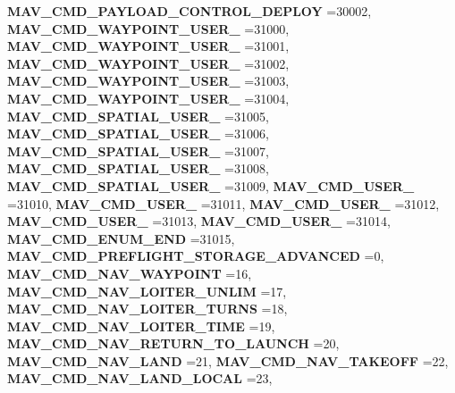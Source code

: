\begin{DoxyCompactItemize}
\textbf{ M\+A\+V\+\_\+\+C\+M\+D\+\_\+\+P\+A\+Y\+L\+O\+A\+D\+\_\+\+C\+O\+N\+T\+R\+O\+L\+\_\+\+D\+E\+P\+L\+OY} =30002, 
\textbf{ M\+A\+V\+\_\+\+C\+M\+D\+\_\+\+W\+A\+Y\+P\+O\+I\+N\+T\+\_\+\+U\+S\+E\+R\+\_} =31000, 
\textbf{ M\+A\+V\+\_\+\+C\+M\+D\+\_\+\+W\+A\+Y\+P\+O\+I\+N\+T\+\_\+\+U\+S\+E\+R\+\_} =31001, 
\newline
\textbf{ M\+A\+V\+\_\+\+C\+M\+D\+\_\+\+W\+A\+Y\+P\+O\+I\+N\+T\+\_\+\+U\+S\+E\+R\+\_} =31002, 
\textbf{ M\+A\+V\+\_\+\+C\+M\+D\+\_\+\+W\+A\+Y\+P\+O\+I\+N\+T\+\_\+\+U\+S\+E\+R\+\_} =31003, 
\textbf{ M\+A\+V\+\_\+\+C\+M\+D\+\_\+\+W\+A\+Y\+P\+O\+I\+N\+T\+\_\+\+U\+S\+E\+R\+\_} =31004, 
\textbf{ M\+A\+V\+\_\+\+C\+M\+D\+\_\+\+S\+P\+A\+T\+I\+A\+L\+\_\+\+U\+S\+E\+R\+\_} =31005, 
\newline
\textbf{ M\+A\+V\+\_\+\+C\+M\+D\+\_\+\+S\+P\+A\+T\+I\+A\+L\+\_\+\+U\+S\+E\+R\+\_} =31006, 
\textbf{ M\+A\+V\+\_\+\+C\+M\+D\+\_\+\+S\+P\+A\+T\+I\+A\+L\+\_\+\+U\+S\+E\+R\+\_} =31007, 
\textbf{ M\+A\+V\+\_\+\+C\+M\+D\+\_\+\+S\+P\+A\+T\+I\+A\+L\+\_\+\+U\+S\+E\+R\+\_} =31008, 
\textbf{ M\+A\+V\+\_\+\+C\+M\+D\+\_\+\+S\+P\+A\+T\+I\+A\+L\+\_\+\+U\+S\+E\+R\+\_} =31009, 
\newline
\textbf{ M\+A\+V\+\_\+\+C\+M\+D\+\_\+\+U\+S\+E\+R\+\_} =31010, 
\textbf{ M\+A\+V\+\_\+\+C\+M\+D\+\_\+\+U\+S\+E\+R\+\_} =31011, 
\textbf{ M\+A\+V\+\_\+\+C\+M\+D\+\_\+\+U\+S\+E\+R\+\_} =31012, 
\textbf{ M\+A\+V\+\_\+\+C\+M\+D\+\_\+\+U\+S\+E\+R\+\_} =31013, 
\newline
\textbf{ M\+A\+V\+\_\+\+C\+M\+D\+\_\+\+U\+S\+E\+R\+\_} =31014, 
\textbf{ M\+A\+V\+\_\+\+C\+M\+D\+\_\+\+E\+N\+U\+M\+\_\+\+E\+ND} =31015, 
\textbf{ M\+A\+V\+\_\+\+C\+M\+D\+\_\+\+P\+R\+E\+F\+L\+I\+G\+H\+T\+\_\+\+S\+T\+O\+R\+A\+G\+E\+\_\+\+A\+D\+V\+A\+N\+C\+ED} =0, 
\textbf{ M\+A\+V\+\_\+\+C\+M\+D\+\_\+\+N\+A\+V\+\_\+\+W\+A\+Y\+P\+O\+I\+NT} =16, 
\newline
\textbf{ M\+A\+V\+\_\+\+C\+M\+D\+\_\+\+N\+A\+V\+\_\+\+L\+O\+I\+T\+E\+R\+\_\+\+U\+N\+L\+IM} =17, 
\textbf{ M\+A\+V\+\_\+\+C\+M\+D\+\_\+\+N\+A\+V\+\_\+\+L\+O\+I\+T\+E\+R\+\_\+\+T\+U\+R\+NS} =18, 
\textbf{ M\+A\+V\+\_\+\+C\+M\+D\+\_\+\+N\+A\+V\+\_\+\+L\+O\+I\+T\+E\+R\+\_\+\+T\+I\+ME} =19, 
\textbf{ M\+A\+V\+\_\+\+C\+M\+D\+\_\+\+N\+A\+V\+\_\+\+R\+E\+T\+U\+R\+N\+\_\+\+T\+O\+\_\+\+L\+A\+U\+N\+CH} =20, 
\newline
\textbf{ M\+A\+V\+\_\+\+C\+M\+D\+\_\+\+N\+A\+V\+\_\+\+L\+A\+ND} =21, 
\textbf{ M\+A\+V\+\_\+\+C\+M\+D\+\_\+\+N\+A\+V\+\_\+\+T\+A\+K\+E\+O\+FF} =22, 
\textbf{ M\+A\+V\+\_\+\+C\+M\+D\+\_\+\+N\+A\+V\+\_\+\+L\+A\+N\+D\+\_\+\+L\+O\+C\+AL} =23, 

\end{DoxyCompactItemize}
